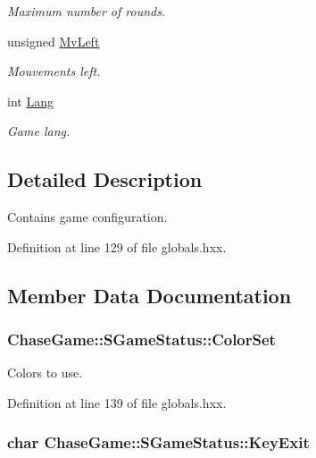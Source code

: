 \begin{DoxyCompactItemize}
\begin{DoxyCompactList}\small\item\em Maximum number of rounds. \end{DoxyCompactList}\item 
unsigned \hyperlink{struct_chase_game_1_1_s_game_status_ae06758bdc7c2bda68801afd314837532}{Mv\-Left}
\begin{DoxyCompactList}\small\item\em Mouvements left. \end{DoxyCompactList}\item 
int \hyperlink{struct_chase_game_1_1_s_game_status_a93c5db2ceb07569075406e865949b4d9}{Lang}
\begin{DoxyCompactList}\small\item\em Game lang. \end{DoxyCompactList}\end{DoxyCompactItemize}


\subsection{Detailed Description}
Contains game configuration. 

Definition at line 129 of file globals.\-hxx.



\subsection{Member Data Documentation}
\hypertarget{struct_chase_game_1_1_s_game_status_adc7431634611868499b650c2dc6a67b6}{
\subsubsection[{Color\-Set}]{ Chase\-Game\-::\-S\-Game\-Status\-::\-Color\-Set}}\label{struct_chase_game_1_1_s_game_status_adc7431634611868499b650c2dc6a67b6}


Colors to use. 



Definition at line 139 of file globals.\-hxx.

\hypertarget{struct_chase_game_1_1_s_game_status_a6a88e0903d13f10f4fcf8050157b2bdb}{
\subsubsection[{Key\-Exit}]{\setlength{\rightskip}{0pt plus 5cm}char Chase\-Game\-::\-S\-Game\-Status\-::\-Key\-Exit}}\label{struct_chase_game_1_1_s_game_status_a6a88e0903d13f10f4fcf8050157b2bdb}


